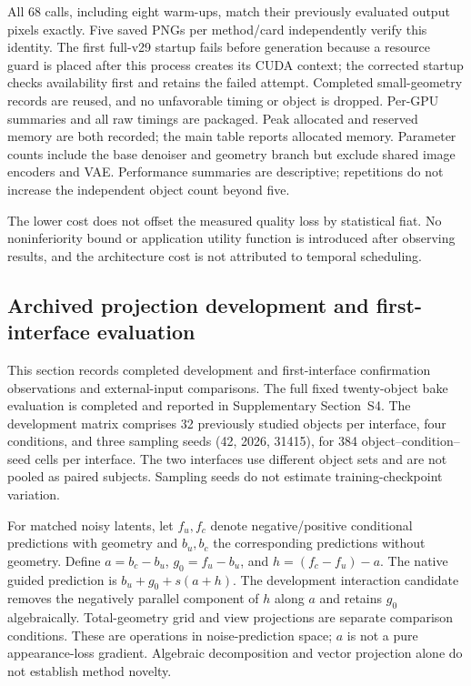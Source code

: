 \documentclass[11pt]{article}
\begin{document}
All 68 calls, including eight warm-ups, match their previously evaluated output pixels exactly. Five saved PNGs per method/card independently verify this identity. The first full-v29 startup fails before generation because a resource guard is placed after this process creates its CUDA context; the corrected startup checks availability first and retains the failed attempt. Completed small-geometry records are reused, and no unfavorable timing or object is dropped. Per-GPU summaries and all raw timings are packaged. Peak allocated and reserved memory are both recorded; the main table reports allocated memory. Parameter counts include the base denoiser and geometry branch but exclude shared image encoders and VAE. Performance summaries are descriptive; repetitions do not increase the independent object count beyond five.

\begin{center}\scriptsize

\end{center}
The lower cost does not offset the measured quality loss by statistical fiat. No noninferiority bound or application utility function is introduced after observing results, and the architecture cost is not attributed to temporal scheduling.

\subsection*{Archived projection development and first-interface evaluation}
This section records completed development and first-interface confirmation
observations and external-input comparisons. The full fixed twenty-object bake evaluation is completed and reported in Supplementary Section~S4. The development matrix comprises 32 previously
studied objects per interface, four conditions, and three sampling seeds
(42, 2026, 31415), for 384 object--condition--seed cells per interface. The two
interfaces use different object sets and are not pooled as paired subjects.
Sampling seeds do not estimate training-checkpoint variation.

For matched noisy latents, let $f_u,f_c$ denote negative/positive conditional
predictions with geometry and $b_u,b_c$ the corresponding predictions without
geometry. Define $a=b_c-b_u$, $g_0=f_u-b_u$, and
$h=(f_c-f_u)-a$. The native guided prediction is $b_u+g_0+s(a+h)$.
The development interaction candidate removes the negatively parallel component
of $h$ along $a$ and retains $g_0$ algebraically. Total-geometry grid and
view projections are separate comparison conditions. These are operations in
noise-prediction space; $a$ is not a pure appearance-loss gradient. Algebraic
decomposition and vector projection alone do not establish method novelty.
\end{document}
